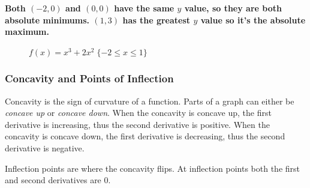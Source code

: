 \documentclass[12pt]{article}
\begin{document}
                \noindent \textbf{Both $(-2, 0)$ and $(0, 0)$ have the same $y$ value, so they are both absolute minimums. $(1, 3)$ has the greatest $y$ value so it's the absolute maximum.}
                \begin{figure}[H]
                    \begin{center}
                        \caption{$f(x) = x^3 + 2x^2 \; \{-2 \le x \le 1 \}$}
                        \label{fig:absextremaclosed}
                    \end{center}
                \end{figure}

            \subsubsection{Concavity and Points of Inflection}
                Concavity is the sign of curvature of a function. Parts of a graph can either be \textit{concave up} or \textit{concave down}. When the concavity is concave up, the first derivative is increasing, thus the second derivative is positive. When the concavity is concave down, the first derivative is decreasing, thus the second derivative is negative.

                Inflection points are where the concavity flips. At inflection points both the first and second derivatives are $0$.
\end{document}
